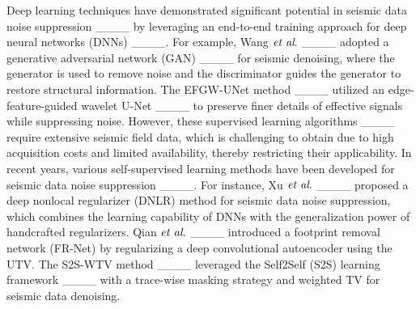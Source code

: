 Deep learning techniques have demonstrated significant potential in seismic data noise suppression ____ by leveraging an end-to-end training approach for deep neural networks (DNNs) ____. For example, Wang $\emph{et al}.$ ____ adopted a generative adversarial network (GAN) ____ for seismic denoising, where the generator is used to remove noise and the discriminator guides the generator to restore structural information. The EFGW-UNet method ____ utilized an edge-feature-guided wavelet U-Net ____ to preserve finer details of effective signals while suppressing noise. However, these supervised learning algorithms ____ require extensive seismic field data, which is challenging to obtain due to high acquisition costs and limited availability, thereby restricting their applicability. In recent years, various self-supervised learning methods have been developed for seismic data noise suppression ____. For instance, Xu $\emph{et al}.$ ____ proposed a deep nonlocal regularizer (DNLR) method for seismic data noise suppression, which combines the learning capability of DNNs with the generalization power of handcrafted regularizers. Qian $\emph{et al}.$ ____ introduced a footprint removal network (FR-Net) by regularizing a deep convolutional autoencoder using the UTV. The S2S-WTV method ____ leveraged the Self2Self (S2S) learning framework ____ with a trace-wise masking strategy and weighted TV for seismic data denoising.